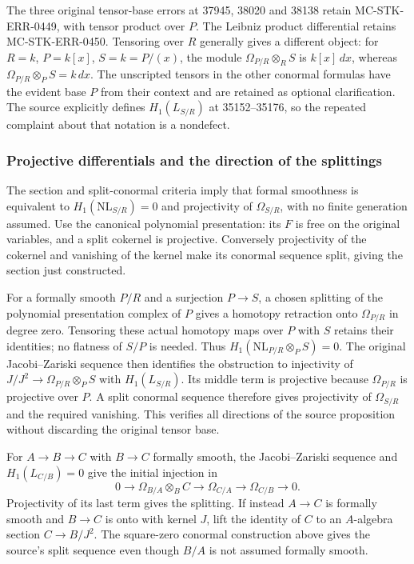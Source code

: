 The three original tensor-base errors at 37945, 38020 and 38138 retain MC-\AlgebraIdentifierBreak{}STK-\AlgebraIdentifierBreak{}ERR-\AlgebraIdentifierBreak{}0449, with tensor product over \(P\). The Leibniz product differential retains MC-\AlgebraIdentifierBreak{}STK-\AlgebraIdentifierBreak{}ERR-\AlgebraIdentifierBreak{}0450. Tensoring over \(R\) generally gives a different object: for \(R=k\), \(P=k[x]\), \(S=k=P/(x)\), the module \(\Omega_{P/R}\otimes_RS\) is \(k[x]\,dx\), whereas \(\Omega_{P/R}\otimes_PS=k\,dx\). The unscripted tensors in the other conormal formulas have the evident base \(P\) from their context and are retained as optional clarification. The source explicitly defines \(H_1(L_{S/R})\) at 35152--35176, so the repeated complaint about that notation is a nondefect.

\subsubsection{Projective differentials and the direction of the splittings}\label{algebra-proof-048-projective-differentials-and-the-direction-of-the-splittings}

The section and split-conormal criteria imply that formal smoothness is equivalent to \(H_1(\mathrm{NL}_{S/R})=0\) and projectivity of \(\Omega_{S/R}\), with no finite generation assumed. Use the canonical polynomial presentation: its \(F\) is free on the original variables, and a split cokernel is projective. Conversely projectivity of the cokernel and vanishing of the kernel make its conormal sequence split, giving the section just constructed.

For a formally smooth \(P/R\) and a surjection \(P\to S\), a chosen splitting of the polynomial presentation complex of \(P\) gives a homotopy retraction onto \(\Omega_{P/R}\) in degree zero. Tensoring these actual homotopy maps over \(P\) with \(S\) retains their identities; no flatness of \(S/P\) is needed. Thus \(H_1(\mathrm{NL}_{P/R}\otimes_PS)=0\). The original Jacobi--Zariski sequence then identifies the obstruction to injectivity of \(J/J^2\to\Omega_{P/R}\otimes_PS\) with \(H_1(L_{S/R})\). Its middle term is projective because \(\Omega_{P/R}\) is projective over \(P\). A split conormal sequence therefore gives projectivity of \(\Omega_{S/R}\) and the required vanishing. This verifies all directions of the source proposition without discarding the original tensor base.

For \(A\to B\to C\) with \(B\to C\) formally smooth, the Jacobi--Zariski sequence and \(H_1(L_{C/B})=0\) give the initial injection in \[
0\longrightarrow\Omega_{B/A}\otimes_BC\longrightarrow
\Omega_{C/A}\longrightarrow\Omega_{C/B}\longrightarrow0.
\] Projectivity of its last term gives the splitting. If instead \(A\to C\) is formally smooth and \(B\to C\) is onto with kernel \(J\), lift the identity of \(C\) to an \(A\)-algebra section \(C\to B/J^2\). The square-zero conormal construction above gives the source's split sequence even though \(B/A\) is not assumed formally smooth.

